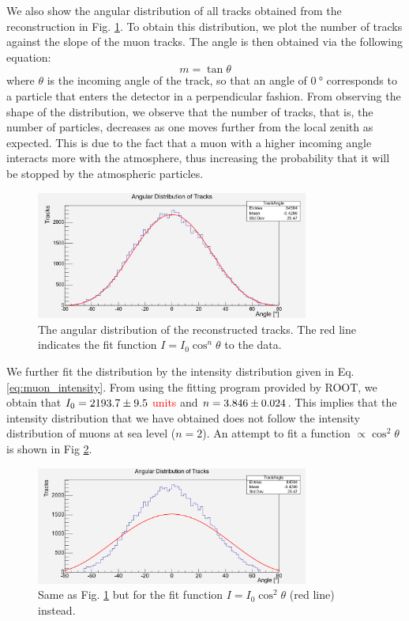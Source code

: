 \documentclass[a4paper]{report}
\numberwithin{equation}{section}
\begin{document}
We also show the angular distribution of all tracks obtained from the reconstruction in Fig. \ref{fig:tracksangle}. To obtain this distribution, we 
plot the number of tracks against the slope of the muon tracks. The angle is then obtained via the following equation:
\begin{equation}
	m = \tan \theta
\end{equation}
where $\theta$ is the incoming angle of the track, so that an angle of $\SI{0}{\degree}$ corresponds to a particle that enters the 
detector in a perpendicular fashion. From observing the shape of the distribution, we observe that the number of tracks, that is, 
the number of particles, decreases as one moves further from the local zenith as expected. This is due to the fact that a muon with a 
higher incoming angle interacts more with the atmosphere, thus increasing the probability that it will be stopped by the atmospheric
particles. \par 

\begin{figure}[!h]
	\centering
	\includegraphics[width=0.8\textwidth]{trackangle.png}
	\caption{The angular distribution of the reconstructed tracks. The red line indicates the fit function $I = I_0 \cos^n \theta$
			to the data. }
	\label{fig:tracksangle}
\end{figure}


We further fit the distribution by the intensity distribution given in Eq. \ref{eq:muon_intensity}. From using the fitting 
program provided by ROOT, we obtain that $I_0 = \num{2193.7 \pm 9.5}$ \textcolor{red}{units} and $n = \num{3.846 \pm 0.024}$. This implies that 
the intensity distribution that we have obtained does not follow the intensity distribution of muons at sea level ($n = 2$). 
An attempt to fit a function $\propto \cos ^2 \theta$ is shown in Fig \ref{fig:tracksangle_cos2fit}. 

\begin{figure}[!h]
	\centering
	\includegraphics[width=0.8\textwidth]{trackangle_cos2fit.png}
	\caption{Same as Fig. \ref{fig:tracksangle} but for the fit function $I = I_0 \cos^2 \theta$ (red line) instead. }
	\label{fig:tracksangle_cos2fit}
\end{figure}
\end{document}
